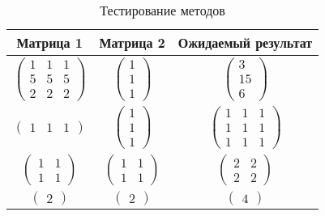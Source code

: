 \captionsetup{justification=raggedright,singlelinecheck=false}
\begin{table}[H]
	\caption{\label{tabular:test_rec} Тестирование методов}
	\begin{center}
		\begin{tabular}{|c|c|c|}
			\hline
			Матрица 1 & Матрица 2 &Ожидаемый результат \\ 
			\hline

			$\begin{pmatrix}
				1 & 1 & 1\\
				5 & 5 & 5\\
				2 & 2 & 2
			\end{pmatrix}$ &
			$\begin{pmatrix}
				1 \\
				1 \\
				1 
			\end{pmatrix}$ &
			$\begin{pmatrix}
				3 \\
				15 \\
				6
			\end{pmatrix}$ \\
			\hline

			$\begin{pmatrix}
				1 & 1 & 1
			\end{pmatrix}$ &
			$\begin{pmatrix}
				1 \\
				1 \\
				1
			\end{pmatrix}$ &
			$\begin{pmatrix}
				1 & 1 & 1\\
				1 & 1 & 1 \\
				1 & 1 & 1
			\end{pmatrix}$ \\
			\hline

			$\begin{pmatrix}
				1 & 1 \\
				1 & 1
			\end{pmatrix}$ &
			$\begin{pmatrix}
				1 & 1\\
				1 & 1
			\end{pmatrix}$ &
			$\begin{pmatrix}
				2 & 2\\
				2 & 2
			\end{pmatrix}$ \\
			\hline

			$\begin{pmatrix}
				2
			\end{pmatrix}$ &
			$\begin{pmatrix}
				2
			\end{pmatrix}$ &
			$\begin{pmatrix}
				4
			\end{pmatrix}$ \\
			\hline


\end{tabular}
\end{center}
\end{table}
